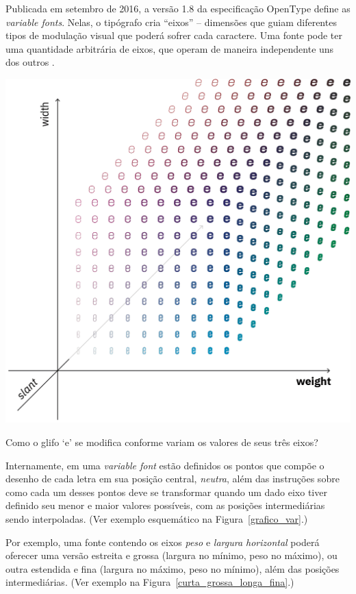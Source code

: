 \documentclass[a4paper]{tufte-handout}
\begin{document}
Publicada em setembro de 2016, a versão 1.8 da especificação OpenType define as \textit{variable fonts}. Nelas, o tipógrafo cria ``eixos'' -- dimensões que guiam diferentes tipos de modulação visual que poderá sofrer cada caractere. Uma fonte pode ter uma quantidade arbitrária de eixos, que operam de maneira independente uns dos outros \citep{varfontssepcs}. 

\begin{marginfigure}[-4\baselineskip]
  \includegraphics{imgs/grafico-var.png}
  \caption{Como o glifo `e' se modifica conforme variam os valores de seus três eixos?}
  \label{grafico_var}
\end{marginfigure}
    
Internamente, em uma \textit{variable font} estão definidos os pontos que compõe o desenho de cada letra em sua posição central, \textit{neutra}, além das instruções sobre como cada um desses pontos deve se transformar quando um dado eixo tiver definido seu menor e maior valores possíveis, com as posições intermediárias sendo interpoladas. (Ver exemplo esquemático na Figura~\ref{grafico_var}.)
    
Por exemplo, uma fonte contendo os eixos \textit{peso} e \textit{largura horizontal} poderá oferecer uma versão estreita e grossa (largura no mínimo, peso no máximo), ou outra estendida e fina (largura no máximo, peso no mínimo), além das posições intermediárias. (Ver exemplo na Figura~\ref{curta_grossa_longa_fina}.)
\end{document}
